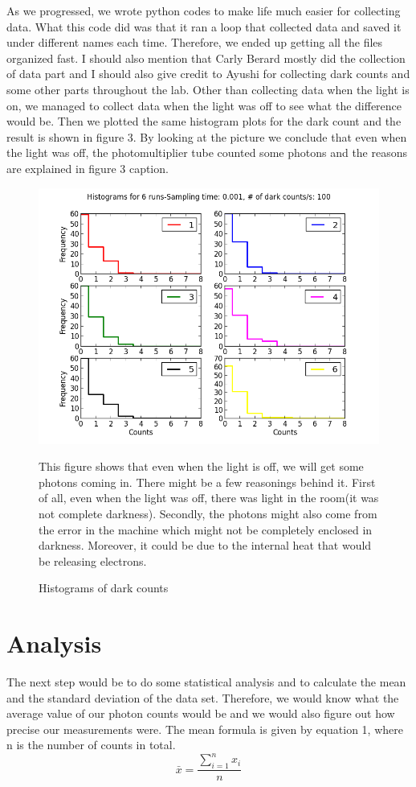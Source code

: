 \documentclass[letterpaper,12pt]{article}
\begin{document}
As we progressed, we wrote python codes to make life much easier for collecting data. What this code did was that it ran a loop that collected data and saved it under different names each time. Therefore, we ended up getting all the files organized fast. I should also mention that Carly Berard mostly did the collection of data part and I should also give credit to Ayushi for collecting dark counts and some other parts throughout the lab. 
Other than collecting data when the light is on, we managed to collect data when the light was off to see what the difference would be. Then we plotted the same histogram plots for the dark count and the result is shown in figure 3. By looking at the picture we conclude that even when the light was off, the photomultiplier tube counted some photons and the reasons are explained in figure 3 caption.

\begin{figure}[t]
\centering
\includegraphics[scale=0.7]{Darkcounts1.png}
\caption{Histograms of dark counts}
This figure shows that even when the light is off, we will get some photons coming in. There might be a few reasonings behind it. First of all, even when the light was off, there was light in the room(it was not complete darkness). Secondly, the photons might also come from the error in the machine which might not be completely enclosed in darkness. Moreover, it could be due to the internal heat that would be releasing electrons.
\end{figure}

\section{Analysis}
\label{sec:analysis}
The next step would be to do some statistical analysis and to calculate the mean and the standard deviation of the data set. Therefore, we would know what the average value of our photon counts would be and we would also figure out how precise our measurements were.
The mean formula is given by equation 1, where n is the number of counts in total.
\begin{equation} \label{E:mean}
\bar{x} = \frac{\sum_{i=1}^{n}x_{i}} {n}
\end{equation}
\end{document}
